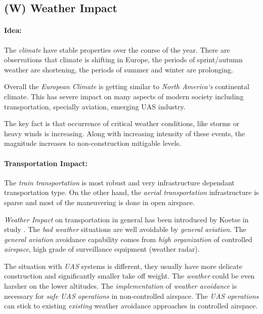 \subsection{(W) Weather Impact}\label{sec:WeatherImpact}

\paragraph{Idea:} The \emph{climate} have stable properties over the course of the year. There are observations that climate is shifting in Europe, the periods of sprint/autumn weather are shortening, the periods of summer and winter are prolonging. 

Overall the \emph{European Climate} is getting similar to \emph{North America`s} continental climate. This has severe impact on many aspects of modern society including transportation, specially aviation, emerging UAS industry. 

The key fact is that occurrence of critical weather conditions, like storms or heavy winds is increasing. Along with increasing intensity of these events, the magnitude increases to non-construction mitigable levels.

\paragraph{Transportation Impact:} The \emph{train transportation} is most robust and very infrastructure dependant transportation type. On the other hand, the \emph{aerial transportation} infrastructure is sparse and most of the maneuvering is done in open airspace. 

\emph{Weather Impact} on transportation in general has been introduced by Koetse in study \cite{koetse2009impact}. The \emph{bad weather} situations are well avoidable by \emph{general aviation}. The \emph{general aviation} avoidance capability comes from \emph{high organization} of controlled \emph{airspace}, high grade of surveillance equipment (weather radar).

The situation with \emph{UAS} systems is different, they usually have more delicate construction and significantly smaller take off weight. The \emph{weather} could be even harsher on the lower altitudes. The \emph{implementation} of \emph{weather avoidance} is necessary for \emph{safe UAS operations} in non-controlled airspace. The \emph{UAS operations} can stick to existing \emph{existing} weather avoidance approaches in controlled airspace. 

